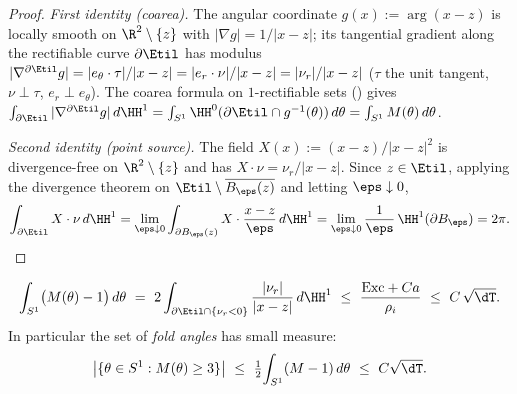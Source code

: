 \begin{proof}
\emph{First identity (coarea).} The angular coordinate
$g(x):=\arg(x-z)$ is locally smooth on $\R^2\setminus\{z\}$ with
$|\nabla g|=1/|x-z|$; its tangential gradient along the rectifiable curve
$\partial\Etil$ has modulus $|\nabla^{\partial\Etil}g|=|e_\theta\cdot\tau|/
|x-z|=|e_r\cdot\nu|/|x-z|=|\nu_r|/|x-z|$ ($\tau$ the unit tangent, $\nu\perp
\tau$, $e_r\perp e_\theta$). The coarea formula on $1$-rectifiable sets
\textup{(}\cite[Theorem~2.93]{AFP2000}\textup{)} gives
$\int_{\partial\Etil}|\nabla^{\partial\Etil}g|\,d\HH^1
=\int_{S^1}\HH^0(\partial\Etil\cap g^{-1}(\theta))\,d\theta
=\int_{S^1}M(\theta)\,d\theta$.

\emph{Second identity (point source).} The field
$X(x):=(x-z)/|x-z|^2$ is divergence-free on $\R^2\setminus\{z\}$ and has
$X\cdot\nu=\nu_r/|x-z|$. Since $z\in\Etil$, applying the divergence theorem
on $\Etil\setminus\overline{B_\eps(z)}$ and letting $\eps\downarrow0$,
\[
   \int_{\partial\Etil}X\cdot\nu\,d\HH^1
   =\lim_{\eps\downarrow0}\int_{\partial B_\eps(z)}X\cdot\frac{x-z}{\eps}\,d\HH^1
   =\lim_{\eps\downarrow0}\frac{1}{\eps}\,\HH^1(\partial B_\eps)=2\pi .
\]
\end{proof}

\begin{proposition}\label{prop:fold}
\begin{equation}\label{eq:fold}
   \int_{S^1}\bigl(M(\theta)-1\bigr)\,d\theta
   \ =\ 2\int_{\partial\Etil\cap\{\nu_r<0\}}\frac{|\nu_r|}{|x-z|}\,d\HH^1
   \ \le\ \frac{\mathrm{Exc}+Ca}{\rho_i}
   \ \le\ C\,\sqrt\dT .
\end{equation}
In particular the set of \emph{fold angles} has small measure:
\begin{equation}\label{eq:foldangles}
   \bigl|\{\theta\in S^1:M(\theta)\ge3\}\bigr|
   \ \le\ \tfrac12\!\int_{S^1}(M-1)\,d\theta\ \le\ C\sqrt\dT .
\end{equation}
\end{proposition}

